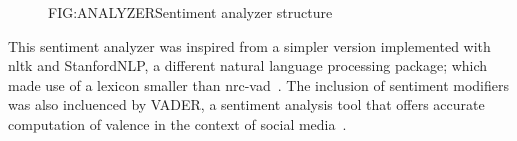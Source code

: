 \begin{figure}[Sentiment analyzer]{FIG:ANALYZER}{Sentiment analyzer structure}\hspace*{1.4em}
\end{figure}

This sentiment analyzer was inspired from a simpler version implemented with \acs{nltk} and StanfordNLP, a different natural language processing package; which made use of a lexicon smaller than \acs{nrc}-\acs{vad}~\cite{SENTIMENTANALYSIS}. The inclusion of sentiment modifiers was also incluenced by VADER, a sentiment analysis tool that offers accurate computation of valence in the context of social media~\cite{VADER}.